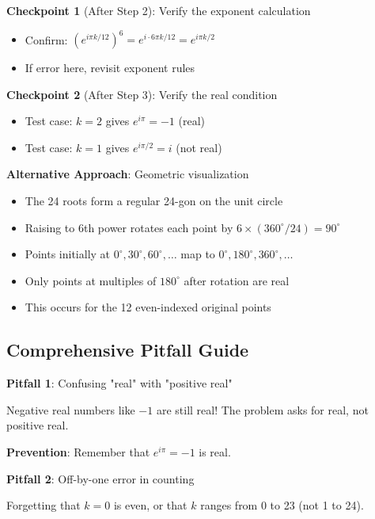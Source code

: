 \documentclass[]{article}
\begin{document}
\begin{solutionbox}
\textbf{Checkpoint 1} (After Step 2): Verify the exponent calculation
\begin{itemize}[leftmargin=*]
    \item Confirm: $(e^{i\pi k/12})^6 = e^{i \cdot 6\pi k/12} = e^{i\pi k/2}$
    \item If error here, revisit exponent rules
\end{itemize}

\textbf{Checkpoint 2} (After Step 3): Verify the real condition
\begin{itemize}[leftmargin=*]
    \item Test case: $k=2$ gives $e^{i\pi} = -1$ (real) \checkmark
    \item Test case: $k=1$ gives $e^{i\pi/2} = i$ (not real) \checkmark
\end{itemize}

\textbf{Alternative Approach}: Geometric visualization
\begin{itemize}[leftmargin=*]
    \item The 24 roots form a regular 24-gon on the unit circle
    \item Raising to 6th power rotates each point by $6 \times (360^\circ/24) = 90^\circ$
    \item Points initially at $0^\circ, 30^\circ, 60^\circ, \ldots$ map to $0^\circ, 180^\circ, 360^\circ, \ldots$
    \item Only points at multiples of $180^\circ$ after rotation are real
    \item This occurs for the 12 even-indexed original points
\end{itemize}

\subsection*{Comprehensive Pitfall Guide}

\begin{warningbox}
\textbf{Pitfall 1}: Confusing "real" with "positive real"

Negative real numbers like $-1$ are still real! The problem asks for real, not positive real.

\textbf{Prevention}: Remember that $e^{i\pi} = -1$ is real.
\end{warningbox}

\begin{warningbox}
\textbf{Pitfall 2}: Off-by-one error in counting

Forgetting that $k=0$ is even, or that $k$ ranges from 0 to 23 (not 1 to 24).


\end{warningbox}
\end{solutionbox}
\end{document}
